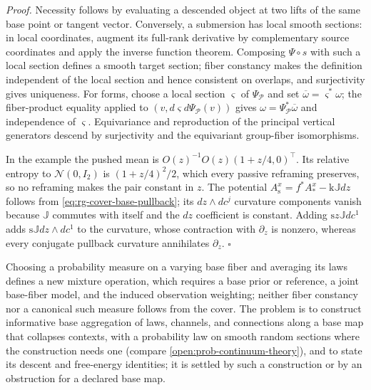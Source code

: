 \noindent\emph{Proof.}
Necessity follows by evaluating a descended object at two lifts of the same base
point or tangent vector. Conversely, a submersion has local smooth sections: in
local coordinates, augment its full-rank derivative by complementary source
coordinates and apply the inverse function theorem. Composing \(\Psi\circ s\) with
such a local section defines a smooth target section; fiber constancy makes the
definition independent of the local section and hence consistent on overlaps, and
surjectivity gives uniqueness. For forms, choose a local section \(\varsigma\) of
\(\Psi_{\mathscr P}\) and set \(\overline\omega=\varsigma^*\omega\); the
fiber-product equality applied to \((v,d\varsigma d\Psi_{\mathscr P}(v))\) gives
\(\omega=\Psi_{\mathscr P}^*\overline\omega\) and independence of \(\varsigma\).
Equivariance and reproduction of the principal vertical generators descend by
surjectivity and the equivariant group-fiber isomorphisms.

In the example the pushed mean is \(O(z)^{-1}O(z)(1+z/4,0)^\top\). Its relative
entropy to \(\mathcal N(0,I_2)\) is \((1+z/4)^2/2\), which every passive
reframing preserves, so no reframing makes the pair constant in \(z\). The
potential \(A^x_{\mathrm s}=f^*A^x_*-\mathrm k\mathbb Jdz\) follows from
\eqref{eq:rg-cover-base-pullback}; its \(dz\wedge dc^j\) curvature components
vanish because \(\mathbb J\) commutes with itself and the \(dz\) coefficient is
constant. Adding \(\mathrm sz\mathbb Jdc^1\) adds \(\mathrm s\mathbb Jdz\wedge dc^1\)
to the curvature, whose contraction with \(\partial_z\) is nonzero, whereas every
conjugate pullback curvature annihilates \(\partial_z\). \(\square\)

Choosing a probability measure on a varying base fiber and averaging its laws
defines a new mixture operation, which requires a base prior or reference, a joint
base-fiber model, and the induced observation weighting; neither fiber constancy
nor a canonical such measure follows from the cover. The problem is to construct
informative base aggregation of laws, channels, and connections along a base map
that collapses contexts, with a probability law on smooth random sections where
the construction needs one (compare \cref{open:prob-continuum-theory}), and to
state its descent and free-energy identities; it is settled by such a construction
or by an obstruction for a declared base map.
